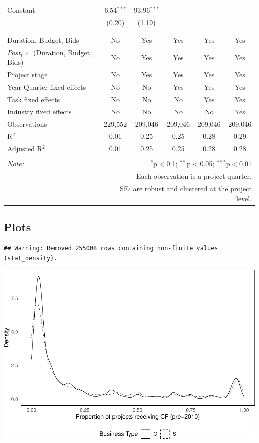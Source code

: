 \documentclass[
]{article}
\begin{document}
\begin{table}[H]
\begin{tabular}{@{\extracolsep{-2pt}}lccccc}
 Constant & 6.54$^{***}$ & 93.96$^{***}$ &  &  &  \\ 
  & (0.20) & (1.19) &  &  &  \\ 
  & & & & & \\ 
\hline \\[-1.8ex] 
Duration, Budget, Bids & No & Yes & Yes & Yes & Yes \\ 
$Post_t \times $  (Duration, Budget, Bids) & No & Yes & Yes & Yes & Yes \\ 
Project stage & No & Yes & Yes & Yes & Yes \\ 
Year-Quarter fixed effects & No & No & Yes & Yes & Yes \\ 
Task fixed effects & No & No & No & Yes & Yes \\ 
Industry fixed effects & No & No & No & No & Yes \\ 
Observations & 229,552 & 209,046 & 209,046 & 209,046 & 209,046 \\ 
R$^{2}$ & 0.01 & 0.25 & 0.25 & 0.28 & 0.29 \\ 
Adjusted R$^{2}$ & 0.01 & 0.25 & 0.25 & 0.28 & 0.28 \\ 
\hline 
\hline \\[-1.8ex] 
\textit{Note:}  & \multicolumn{5}{r}{$^{*}$p$<$0.1; $^{**}$p$<$0.05; $^{***}$p$<$0.01} \\ 
 & \multicolumn{5}{r}{Each observation is a project-quarter.} \\ 
 & \multicolumn{5}{r}{SEs are robust and clustered at the project level.} \\ 
\end{tabular} 
\end{table}

\hypertarget{plots}{%
\subsection{Plots}\label{plots}}

\begin{verbatim}
## Warning: Removed 255008 rows containing non-finite values (stat_density).
\end{verbatim}

\includegraphics{qp_first_pc_delay-2_files/figure-latex/cf_plots-1.pdf}
\end{document}
